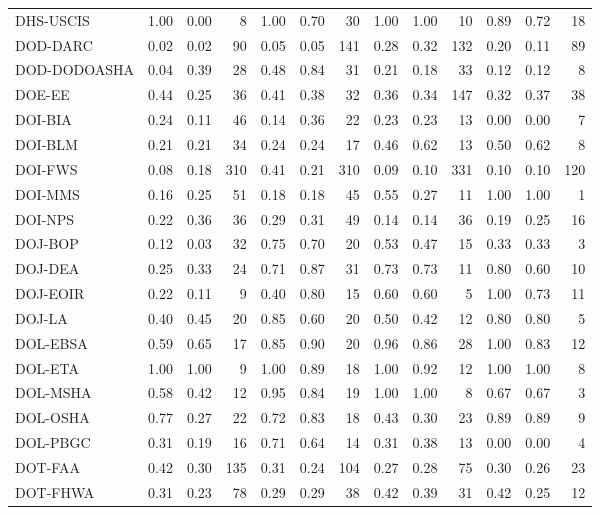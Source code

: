 \begin{table}[ht]
\begin{tabular}{lrrrrrrrrrrrr}
  DHS-USCIS & 1.00 & 0.00 &   8 & 1.00 & 0.70 &  30 & 1.00 & 1.00 &  10 & 0.89 & 0.72 &  18 \\ 
  DOD-DARC & 0.02 & 0.02 &  90 & 0.05 & 0.05 & 141 & 0.28 & 0.32 & 132 & 0.20 & 0.11 &  89 \\ 
  DOD-DODOASHA & 0.04 & 0.39 &  28 & 0.48 & 0.84 &  31 & 0.21 & 0.18 &  33 & 0.12 & 0.12 &   8 \\ 
  DOE-EE & 0.44 & 0.25 &  36 & 0.41 & 0.38 &  32 & 0.36 & 0.34 & 147 & 0.32 & 0.37 &  38 \\ 
  DOI-BIA & 0.24 & 0.11 &  46 & 0.14 & 0.36 &  22 & 0.23 & 0.23 &  13 & 0.00 & 0.00 &   7 \\ 
  DOI-BLM & 0.21 & 0.21 &  34 & 0.24 & 0.24 &  17 & 0.46 & 0.62 &  13 & 0.50 & 0.62 &   8 \\ 
  DOI-FWS & 0.08 & 0.18 & 310 & 0.41 & 0.21 & 310 & 0.09 & 0.10 & 331 & 0.10 & 0.10 & 120 \\ 
  DOI-MMS & 0.16 & 0.25 &  51 & 0.18 & 0.18 &  45 & 0.55 & 0.27 &  11 & 1.00 & 1.00 &   1 \\ 
  DOI-NPS & 0.22 & 0.36 &  36 & 0.29 & 0.31 &  49 & 0.14 & 0.14 &  36 & 0.19 & 0.25 &  16 \\ 
  DOJ-BOP & 0.12 & 0.03 &  32 & 0.75 & 0.70 &  20 & 0.53 & 0.47 &  15 & 0.33 & 0.33 &   3 \\ 
  DOJ-DEA & 0.25 & 0.33 &  24 & 0.71 & 0.87 &  31 & 0.73 & 0.73 &  11 & 0.80 & 0.60 &  10 \\ 
  DOJ-EOIR & 0.22 & 0.11 &   9 & 0.40 & 0.80 &  15 & 0.60 & 0.60 &   5 & 1.00 & 0.73 &  11 \\ 
  DOJ-LA & 0.40 & 0.45 &  20 & 0.85 & 0.60 &  20 & 0.50 & 0.42 &  12 & 0.80 & 0.80 &   5 \\ 
  DOL-EBSA & 0.59 & 0.65 &  17 & 0.85 & 0.90 &  20 & 0.96 & 0.86 &  28 & 1.00 & 0.83 &  12 \\ 
  DOL-ETA & 1.00 & 1.00 &   9 & 1.00 & 0.89 &  18 & 1.00 & 0.92 &  12 & 1.00 & 1.00 &   8 \\ 
  DOL-MSHA & 0.58 & 0.42 &  12 & 0.95 & 0.84 &  19 & 1.00 & 1.00 &   8 & 0.67 & 0.67 &   3 \\ 
  DOL-OSHA & 0.77 & 0.27 &  22 & 0.72 & 0.83 &  18 & 0.43 & 0.30 &  23 & 0.89 & 0.89 &   9 \\ 
  DOL-PBGC & 0.31 & 0.19 &  16 & 0.71 & 0.64 &  14 & 0.31 & 0.38 &  13 & 0.00 & 0.00 &   4 \\ 
  DOT-FAA & 0.42 & 0.30 & 135 & 0.31 & 0.24 & 104 & 0.27 & 0.28 &  75 & 0.30 & 0.26 &  23 \\ 
  DOT-FHWA & 0.31 & 0.23 &  78 & 0.29 & 0.29 &  38 & 0.42 & 0.39 &  31 & 0.42 & 0.25 &  12 \\ 

\end{tabular}
\end{table}

